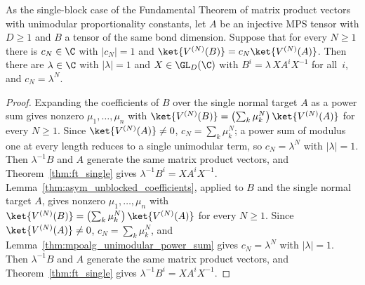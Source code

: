 \begin{theorem}\label{thm:ft_single_phase}
    \leanok
    As the single-block case of the Fundamental Theorem of matrix product
    vectors \cite[Theorem~2.10]{Cirac2016MPDO_arXiv} with unimodular
    proportionality constants, let $A$ be an injective MPS tensor with $D\ge1$
    and $B$ a tensor of the same bond dimension. Suppose that for every $N\ge1$
    there is $c_N\in\C$ with $|c_N|=1$ and
    $\ket{V^{(N)}(B)}=c_N\ket{V^{(N)}(A)}$. Then there are $\lambda\in\C$ with
    $|\lambda|=1$ and $X\in\GL_D(\C)$ with $B^i=\lambda\,XA^iX^{-1}$ for
    all~$i$, and $c_N=\lambda^N$.
\end{theorem}

\begin{proof}
    \leanok
    \ifftmpsvolume
        Expanding the coefficients of $B$ over the single normal target $A$ as a
        power sum gives nonzero $\mu_1,\ldots,\mu_n$ with
        $\ket{V^{(N)}(B)}=\left(\sum_k\mu_k^N\right)\ket{V^{(N)}(A)}$ for every
        $N\ge1$. Since $\ket{V^{(N)}(A)}\neq0$, $c_N=\sum_k\mu_k^N$; a power sum of
        modulus one at every length reduces to a single unimodular term, so
        $c_N=\lambda^N$ with $|\lambda|=1$. Then $\lambda^{-1}B$ and $A$ generate
        the same matrix product vectors, and Theorem~\ref{thm:ft_single} gives
        $\lambda^{-1}B^i=XA^iX^{-1}$.
    \else
        Lemma~\ref{thm:asym_unblocked_coefficients}, applied to $B$ and the single
        normal target $A$, gives nonzero $\mu_1,\ldots,\mu_n$ with
        $\ket{V^{(N)}(B)}=\left(\sum_k\mu_k^N\right)\ket{V^{(N)}(A)}$ for every
        $N\ge1$. Since $\ket{V^{(N)}(A)}\neq0$, $c_N=\sum_k\mu_k^N$, and
        Lemma~\ref{thm:mpoalg_unimodular_power_sum} gives $c_N=\lambda^N$ with
        $|\lambda|=1$. Then $\lambda^{-1}B$ and $A$ generate the same matrix
        product vectors, and Theorem~\ref{thm:ft_single} gives
        $\lambda^{-1}B^i=XA^iX^{-1}$.
    \fi
\end{proof}
